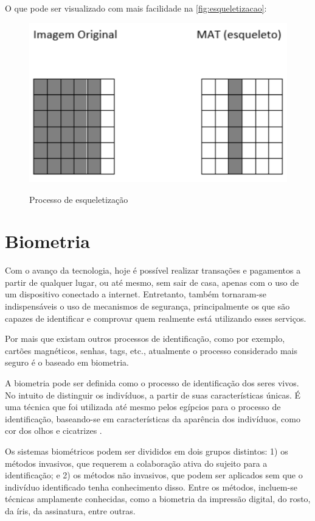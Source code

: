 O que pode ser visualizado com mais facilidade na \autoref{fig:esqueletizacao}:

\begin{figure}[h!]
    \centering
    \caption{Processo de esqueletização}
    \includegraphics[scale=0.25]{figuras/esqueletizacao.png} 
    \fonte{}%
    \label{fig:esqueletizacao}
    \centering
\end{figure}

\section{Biometria}\label{sec:biometria}

Com o avanço da tecnologia, hoje é possível realizar transações e pagamentos a 
partir de qualquer lugar, ou até mesmo, sem sair de casa, apenas com o uso de 
um dispositivo conectado a internet. Entretanto, também tornaram-se indispensáveis 
o uso de mecanismos de segurança, principalmente os que são capazes de identificar 
e comprovar quem realmente está utilizando esses serviços.

Por mais que existam outros processos de identificação, como por exemplo, cartões 
magnéticos, senhas, tags, etc., atualmente o processo considerado mais seguro é 
o baseado em biometria.

A biometria pode ser definida como o processo de identificação 
dos seres vivos. No intuito de distinguir os indivíduos, a partir de suas 
características únicas. É uma técnica que foi utilizada até mesmo pelos egípcios 
para o processo de identificação, baseando-se em características da
aparência dos indivíduos, como cor dos olhos e cicatrizes \cite{santos2007}.

Os sistemas biométricos podem ser divididos em dois grupos distintos: 
1) os métodos invasivos, que requerem a colaboração ativa do sujeito 
para a identificação; e 2) os métodos não invasivos, que podem ser 
aplicados sem que o indivíduo identificado tenha conhecimento disso. 
Entre os métodos, incluem-se técnicas amplamente conhecidas, 
como a biometria da impressão digital, do rosto, da íris, da assinatura, 
entre outras. \cite{teixeira2011}

